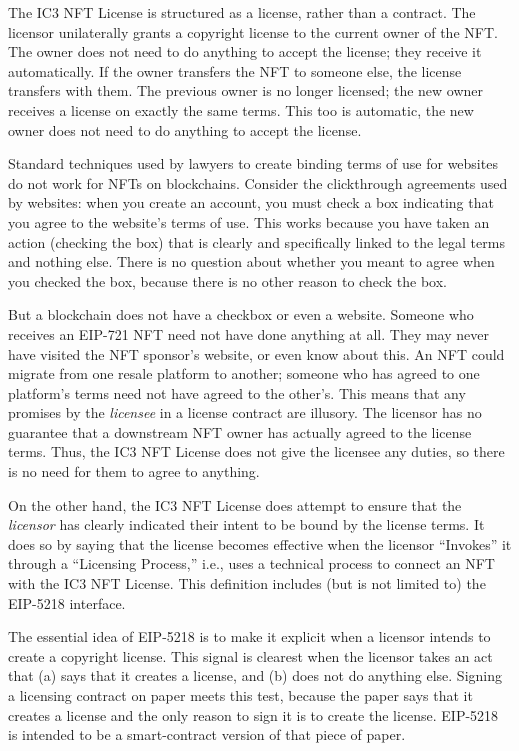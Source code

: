 \documentclass{article}
\newcommand{\eiplicense}{EIP-5218\xspace}
\newcommand{\iccclicense}{IC3 NFT License\xspace}
\begin{document}
The \iccclicense is structured as a license, rather than a contract. The licensor unilaterally grants a copyright license to the current owner of the NFT. The owner does not need to do anything to accept the license; they receive it automatically. If the owner transfers the NFT to someone else, the license transfers with them. The previous owner is no longer licensed; the new owner receives a license on exactly the same terms. This too is automatic, the new owner does not need to do anything to accept the license.

Standard techniques used by lawyers to create binding terms of use for websites do not work for NFTs on blockchains. Consider the clickthrough agreements used by websites: when you create an account, you must check a box indicating that you agree to the website's terms of use. This works because you have taken an action (checking the box) that is clearly and specifically linked to the legal terms and nothing else. There is no question about whether you meant to agree when you checked the box, because there is no other reason to check the box. 

But a blockchain does not have a checkbox or even a website. Someone who receives an EIP-721 NFT need not have done anything at all. They may never have visited the NFT sponsor's website, or even know about this. An NFT could  migrate from one resale platform to another; someone who has agreed to one platform's terms need not have agreed to the other's. This means that any promises by the \emph{licensee} in a license contract are illusory. The licensor has no guarantee that a downstream NFT owner has actually agreed to the license terms. Thus, the \iccclicense does not give the licensee any duties, so there is no need for them to agree to anything.

On the other hand, the \iccclicense does attempt to ensure that the \emph{licensor} has clearly indicated their intent to be bound by the license terms. It does so by saying that the license becomes effective when the licensor ``Invokes'' it through a ``Licensing Process,'' i.e., uses a technical process to connect an NFT with the \iccclicense. This definition includes (but is not limited to) the \eiplicense interface. 

The essential idea of \eiplicense  is to make it explicit when a licensor intends to create a copyright license. This signal is clearest when the licensor takes an act that (a) says that it creates a license, and (b) does not do anything else. Signing a licensing contract on paper meets this test, because the paper says that it creates a license and the only reason to sign it is to create the license. \eiplicense is intended to be a smart-contract version of that piece of paper. 
\end{document}
